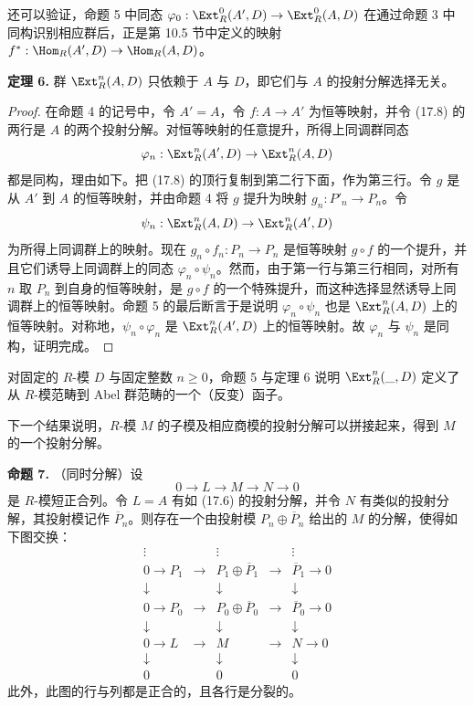 还可以验证，命题 5 中同态 $\varphi_0:\Ext_R^0(A',D)\to\Ext_R^0(A,D)$ 在通过命题 3 中同构识别相应群后，正是第 10.5 节中定义的映射 $f^*:\Hom_R(A',D)\to\Hom_R(A,D)$。

\medskip
\noindent\textbf{定理 6.} 群 $\Ext_R^n(A,D)$ 只依赖于 $A$ 与 $D$，即它们与 $A$ 的投射分解选择无关。

\begin{proof}
在命题 4 的记号中，令 $A'=A$，令 $f:A\to A'$ 为恒等映射，并令 (17.8) 的两行是 $A$ 的两个投射分解。对恒等映射的任意提升，所得上同调群同态
\[
  \varphi_n:\Ext_R^n(A',D)\to\Ext_R^n(A,D)
\]
都是同构，理由如下。把 (17.8) 的顶行复制到第二行下面，作为第三行。令 $g$ 是从 $A'$ 到 $A$ 的恒等映射，并由命题 4 将 $g$ 提升为映射 $g_n:P'_n\to P_n$。令
\[
  \psi_n:\Ext_R^n(A,D)\to\Ext_R^n(A',D)
\]
为所得上同调群上的映射。现在 $g_n\circ f_n:P_n\to P_n$ 是恒等映射 $g\circ f$ 的一个提升，并且它们诱导上同调群上的同态 $\varphi_n\circ\psi_n$。然而，由于第一行与第三行相同，对所有 $n$ 取 $P_n$ 到自身的恒等映射，是 $g\circ f$ 的一个特殊提升，而这种选择显然诱导上同调群上的恒等映射。命题 5 的最后断言于是说明 $\varphi_n\circ\psi_n$ 也是 $\Ext_R^n(A,D)$ 上的恒等映射。对称地，$\psi_n\circ\varphi_n$ 是 $\Ext_R^n(A',D)$ 上的恒等映射。故 $\varphi_n$ 与 $\psi_n$ 是同构，证明完成。
\end{proof}

对固定的 $R$-模 $D$ 与固定整数 $n\geq0$，命题 5 与定理 6 说明 $\Ext_R^n(\_,D)$ 定义了从 $R$-模范畴到 Abel 群范畴的一个（反变）函子。

下一个结果说明，$R$-模 $M$ 的子模及相应商模的投射分解可以拼接起来，得到 $M$ 的一个投射分解。

\medskip
\noindent\textbf{命题 7.} （同时分解）设
\[
  0\to L\to M\to N\to0
\]
是 $R$-模短正合列。令 $L=A$ 有如 (17.6) 的投射分解，并令 $N$ 有类似的投射分解，其投射模记作 $\overline P_n$。则存在一个由投射模 $P_n\oplus\overline P_n$ 给出的 $M$ 的分解，使得如下图交换：
\[
\begin{array}{ccccccccc}
&&\vdots&&\vdots&&\vdots&&\\
&&0\to P_1&\to&P_1\oplus\overline P_1&\to&\overline P_1\to0&&\\
&&\downarrow&&\downarrow&&\downarrow&&\\
&&0\to P_0&\to&P_0\oplus\overline P_0&\to&\overline P_0\to0&&\\
&&\downarrow&&\downarrow&&\downarrow&&\\
&&0\to L&\to&M&\to&N\to0&&\\
&&\downarrow&&\downarrow&&\downarrow&&\\
&&0&&0&&0&&
\end{array}
\tag{17.11}
\]
此外，此图的行与列都是正合的，且各行是分裂的。

